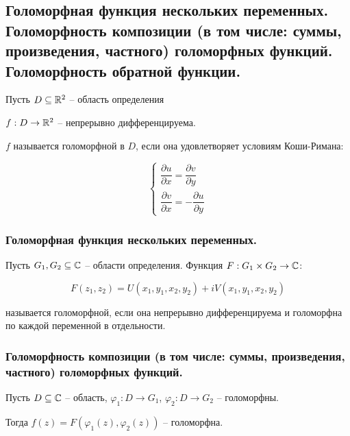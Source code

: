 \subsection{Голоморфная функция нескольких переменных. Голоморфность композиции (в том числе: суммы, произведения, частного) голоморфных функций. Голоморфность обратной функции.}

\begin{definition*}
    Пусть $D \subseteq \mathbb{R}^2$ -- область определения

    $f: D \to \mathbb{R}^2$ -- непрерывно дифференцируема.

    $f$ называется голоморфной в $D$, если она удовлетворяет условиям Коши-Римана:
    
    \begin{equation}
        \begin{cases}
            \dfrac{\partial u}{\partial x} = \dfrac{\partial v}{\partial y} \\
            \dfrac{\partial v}{\partial x} = -\dfrac{\partial u}{\partial y}
        \end{cases}
    \end{equation}

\end{definition*}

\subsubsection{Голоморфная функция нескольких переменных.}

\begin{definition*}
    Пусть $G_1, G_2 \subseteq \mathbb{C}$ -- области определения. Функция $F: G_1 \times G_2 \to \mathbb{C}$:

    \begin{equation}
            F(z_1, z_2) = U(x_1, y_1, x_2, y_2) + i V(x_1, y_1, x_2, y_2)
    \end{equation}
    
    называется голоморфной, если она непрерывно дифференцируема и голоморфна по каждой переменной в отдельности.
\end{definition*}

\subsubsection{Голоморфность композиции (в том числе: суммы, произведения, частного) голоморфных функций.}

\begin{theorem*}
    Пусть $D \subseteq \mathbb{C}$ -- область, $\varphi_1: D \to G_1$, $\varphi_2: D \to G_2$ -- голоморфны. 

    Тогда $f(z) = F\left( \varphi_1(z), \varphi_2(z) \right)$ -- голоморфна.
\end{theorem*}

